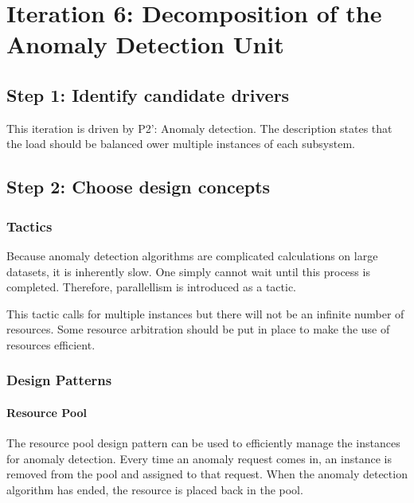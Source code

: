 \section{Iteration 6: Decomposition of the Anomaly Detection Unit}
\label{add:it6}

\subsection{Step 1: Identify candidate drivers}
\label{add:it6/drivers}

\npar This iteration is driven by P2': Anomaly detection. The description states
that the load should be balanced ower multiple instances of each subsystem.

\subsection{Step 2: Choose design concepts}
\label{add:it6/concepts}

\subsubsection{Tactics}
\label{add:it6/tactics}

\npar Because anomaly detection algorithms are complicated calculations on large
datasets, it is inherently slow. One simply cannot wait until this process is
completed. Therefore, parallellism is introduced as a tactic. 

\npar This tactic calls for multiple instances but there will not be an infinite
number of resources. Some resource arbitration should be put in place to make
the use of resources efficient. 

\subsubsection{Design Patterns}
\label{add:it6/patterns}

\paragraph{Resource Pool}

\npar The resource pool design pattern \citep[see][p.~503]{Buschmann:07} can be
used to efficiently manage the instances for anomaly detection. Every time an
anomaly request comes in, an instance is removed from the pool and assigned to
that request. When the anomaly detection algorithm has ended, the resource is
placed back in the pool. 

